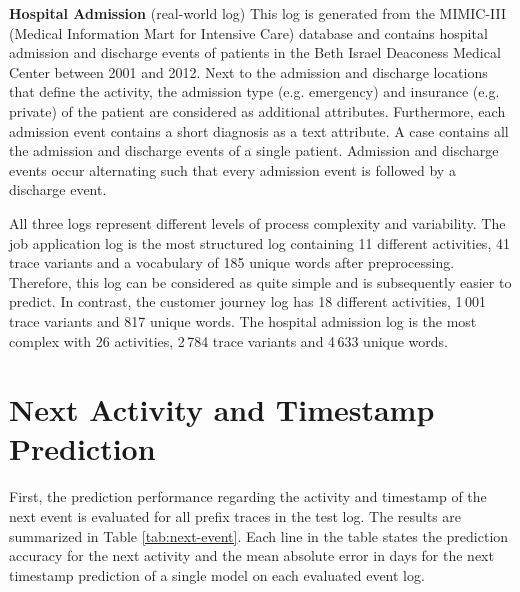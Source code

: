 \textbf{Hospital Admission} (real-world log) This log is generated from the MIMIC-III (Medical Information Mart for Intensive Care) database \cite{johnson2016mimic} and contains hospital admission and discharge events of patients in the Beth Israel Deaconess Medical Center between 2001 and 2012.
Next to the admission and discharge locations that define the activity, the admission type (e.g. emergency) and insurance (e.g. private) of the patient are considered as additional attributes.
Furthermore, each admission event contains a short diagnosis as a text attribute.
A case contains all the admission and discharge events of a single patient.
Admission and discharge events occur alternating such that every admission event is followed by a discharge event.

All three logs represent different levels of process complexity and variability.
The job application log is the most structured log containing 11 different activities, 41 trace variants and a vocabulary of 185 unique words after preprocessing.
Therefore, this log can be considered as quite simple and is subsequently easier to predict.
In contrast, the customer journey log has 18 different activities, 1\,001 trace variants and 817 unique words.
The hospital admission log is the most complex with 26 activities, 2\,784 trace variants and 4\,633 unique words.

\section{Next Activity and Timestamp Prediction}

First, the prediction performance regarding the activity and timestamp of the next event is evaluated for all prefix traces in the test log.
The results are summarized in Table \ref{tab:next-event}.
Each line in the table states the prediction accuracy for the next activity and the mean absolute error in days for the next timestamp prediction of a single model on each evaluated event log.

